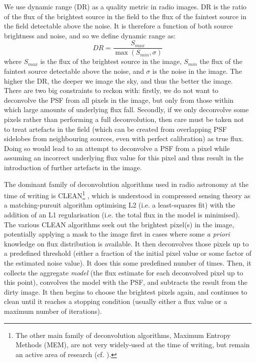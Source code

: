\pg
We use dynamic range (DR) as a quality metric in radio images. DR is the ratio of the flux of the brightest source in the field to the flux of the faintest source in the field detectable above the noise. It is therefore a function of both source brightness and noise, and so we define dynamic range as:
\begin{equation}\label{eq.DR.imag}
DR = \frac{S_{max}}{\max(S_{min},\sigma)}
\end{equation}
where $S_{max}$ is the flux of the brightest source in the image, $S_{min}$ the flux of the faintest source detectable above the noise, and $\sigma$ is the noise in the image. The higher the DR, the deeper we image the sky, and thus the better the image. There are two big constraints to reckon with: firstly, we do not want to deconvolve the PSF from all pixels in the image, but only from those within which large amounts of underlying flux fall. Secondly, if we only deconvolve some pixels rather than performing a full deconvolution, then care must be taken not to treat artefacts in the field (which can be created from overlapping PSF sidelobes from neighbouring sources, even with perfect calibration) as true flux. Doing so would lead to an attempt to deconvolve a PSF from a pixel while assuming an incorrect underlying flux value for this pixel and thus result in the introduction of further artefacts in the image.


\pg
The dominant family of deconvolution algorithms used in radio astronomy at the time of writing is CLEAN\footnote{The other main family of deconvolution algorithms, Maximum Entropy Methods (MEM), are not very widely-used at the time of writing, but remain an active area of research (cf. ).} , which is understood in compressed sensing theory as a matching-pursuit algorithm optimising L2 (i.e. a least-squares fit) with the addition of an L1 regularisation (i.e. the total flux in the model is minimised). The various CLEAN algorithms seek out the brightest pixel(s) in the image, potentially applying a mask to the image first in cases where some \emph{a priori} knowledge on flux distribution is available. It then deconvolves those pixels up to a predefined threshold (either a fraction of the initial pixel value or some factor of the estimated noise value). It does this some predefined number of times. Then, it collects the aggregate \emph{model} (the flux estimate for each deconvolved pixel up to this point), convolves the model with the PSF, and subtracts the result from the dirty image. It then begins to choose the brightest pixels again, and continues to clean until it reaches a stopping condition (usually either a flux value or a maximum number of iterations).

